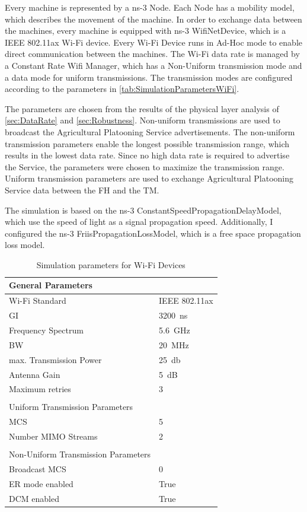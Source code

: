 Every machine is represented by a ns-3 Node. Each Node has a mobility model, which describes the movement of the machine.
In order to exchange data between the machines, every machine is equipped with ns-3 WifiNetDevice, which is a IEEE 802.11ax
Wi-Fi device. Every Wi-Fi Device runs in Ad-Hoc mode to enable direct communication
between the machines. The Wi-Fi data rate is managed by a Constant Rate Wifi Manager, which has a Non-Uniform
transmission mode and a data mode for uniform transmissions.
The transmission modes are configured according
to the parameters in \autoref{tab:SimulationParametersWiFi}.

The parameters are chosen from the results of the physical layer analysis of
\autoref{sec:DataRate} and \autoref{sec:Robustness}.
Non-uniform transmissions are used to broadcast the Agricultural Platooning
Service advertisements.
The non-uniform transmission parameters enable the longest possible
transmission range, which results in the lowest data rate.
Since no high data rate is required to advertise the Service, the parameters were
chosen to maximize the transmission range.
Uniform transmission parameters are used to exchange Agricultural Platooning Service data between
the \ac{FH} and the \ac{TM}. 

The simulation is based on the ns-3 ConstantSpeedPropagationDelayModel, which use the speed of light as a signal
propagation speed.
Additionally, I configured  the ns-3 FriisPropagationLossModel, which is a free space propagation loss model.

\begin{table}[H]
	\centering
	\begin{tabular}{p{6cm}p{4cm}}
		General Parameters & \\
		\midrule
		Wi-Fi Standard & IEEE 802.11ax\\
		\ac{GI} & \SI{3200}{\nano\second}\\
		Frequency Spectrum & \SI{5.6}{\giga\hertz}\\
		\ac{BW} & \SI{20}{\mega\hertz}\\
		max. Transmission Power & \SI{25}{\decibel}\\
		Antenna Gain & \SI{5}{\dB}\\
		Maximum retries & \num{3}\\
		 & \\
		Uniform Transmission Parameters & \\
		\midrule
		\ac{MCS} & \num{5}\\
		Number \ac{MIMO} Streams & \num{2}\\
		 & \\
		Non-Uniform Transmission Parameters & \\
		\midrule
		Broadcast \ac{MCS} & \num{0}\\
		\ac{ER} mode enabled & True\\
		\ac{DCM} enabled & True\\
	\end{tabular}
	\caption{Simulation parameters for Wi-Fi Devices}
	\label{tab:SimulationParametersWiFi}
\end{table}

